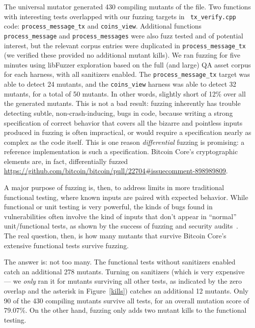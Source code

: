 \begin{sloppypar}
The universal mutator generated 430 compiling mutants of the file.
Two functions with interesting tests overlapped with our fuzzing targets in {\tt
  tx\_verify.cpp} code: {\tt process\_message\_tx} and {\tt coins\_view}.
Additional functions {\tt process\_message} and {\tt process\_messages} were
also fuzz tested and of potential interest, but the relevant corpus entries were
duplicated in {\tt process\_message\_tx} (we verified these provided no
additional mutant kills). We ran fuzzing for five minutes using
libFuzzer exploration based on the full (and large) QA asset corpus for each
harness, with all sanitizers enabled. The {\tt process\_message\_tx} target was
able to detect 24 mutants, and the {\tt coins\_view} harness was able to detect
32 mutants, for a total of 50 mutants. In other words, slightly short of 12\%
over all the generated mutants. This is not a bad result: fuzzing inherently has
trouble detecting subtle, non-crash-inducing, bugs in code, because writing a
strong specification of correct behavior that covers all the bizarre and
pointless inputs produced in fuzzing is often impractical, or would require a
specification nearly as complex as the code itself. This is one reason
\emph{differential} fuzzing is promising: a reference implementation is such a
specification. Bitcoin Core's cryptographic elements are, in fact,
differentially fuzzed
\url{https://github.com/bitcoin/bitcoin/pull/22704#issuecomment-898989809}.
\end{sloppypar}


A major purpose of fuzzing is, then, to address limits in more
traditional functional testing, where known inputs are paired with
expected behavior.  While functional or unit testing is very powerful,
the kinds of bugs found in vulnerabilities often involve the kind of
inputs that don't appear in ``normal'' unit/functional tests, as shown
by the success of fuzzing and security audits~\cite{FC20}.  The real
question, then, is how many mutants that survive Bitcoin Core's
extensive functional tests survive fuzzing.

The answer is: not too many.  The functional tests without sanitizers
enabled catch an additional 278 mutants.  Turning on sanitizers (which
is very expensive --- we \emph{only} ran it for mutants surviving all other
tests, as indicated by the zero overlap and the asterisk in Figure~\ref{kills}) catches an additional 12 mutants.  Only 90 of the
430 compiling mutants survive all tests, for an overall mutation score
of 79.07\%.  On the other hand, fuzzing only adds two mutant kills to
the functional testing.

